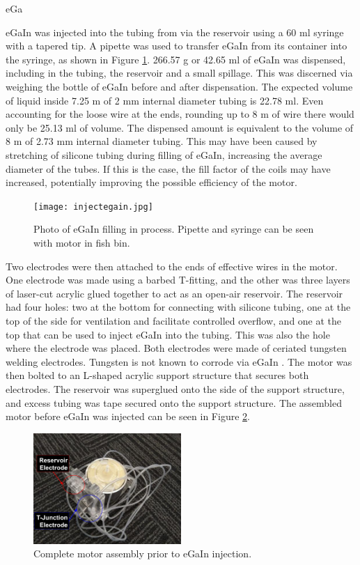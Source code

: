 \documentclass[a4paper,12pt]{article}
\begin{document}
eGa

eGaIn was injected into the tubing from via the reservoir using a 60 ml syringe with a tapered tip. A pipette was used to transfer eGaIn from its container into the syringe, as shown in Figure \ref{fg:injectsyringe}. 266.57 g or 42.65 ml of eGaIn was dispensed, including in the tubing, the reservoir and a small spillage. This was discerned via weighing the bottle of eGaIn before and after dispensation. The expected volume of liquid inside 7.25 m of 2 mm internal diameter tubing is 22.78 ml. Even accounting for the loose wire at the ends, rounding up to 8 m of wire there would only be 25.13 ml of volume. The dispensed amount is equivalent to the volume of 8 m of 2.73 mm internal diameter tubing. This may have been caused by stretching of silicone tubing during filling of eGaIn, increasing the average diameter of the tubes. If this is the case, the fill factor of the coils may have increased, potentially improving the possible efficiency of the motor.

\begin{figure}[h!]
    \centering
    \texttt{[image: injectegain.jpg]}
    \caption{Photo of eGaIn filling in process. Pipette and syringe can be seen with motor in fish bin.}
    \label{fg:injectsyringe}
\end{figure}

Two electrodes were then attached to the ends of effective wires in the motor. One electrode was made using a barbed T-fitting, and the other was three layers of laser-cut acrylic glued together to act as an open-air reservoir. The reservoir had four holes: two at the bottom for connecting with silicone tubing, one at the top of the side for ventilation and facilitate controlled overflow, and one at the top that can be used to inject eGaIn into the tubing. This was also the hole where the electrode was placed. Both electrodes were made of ceriated tungsten welding electrodes. Tungsten is not known to corrode via eGaIn \cite{indiumcorporationPRODUCTDATASHEET2019}. The motor was then bolted to an L-shaped acrylic support structure that secures both electrodes. The reservoir was superglued onto the side of the support structure, and excess tubing was tape secured onto the support structure. The assembled motor before eGaIn was injected can be seen in Figure \ref{fg:jignoegain}.

\begin{figure}[h!]
    \centering
    \includegraphics[width=0.5\textwidth]{jignoegain.png}
    \caption{Complete motor assembly prior to eGaIn injection.}
    \label{fg:jignoegain}
\end{figure}
\end{document}
